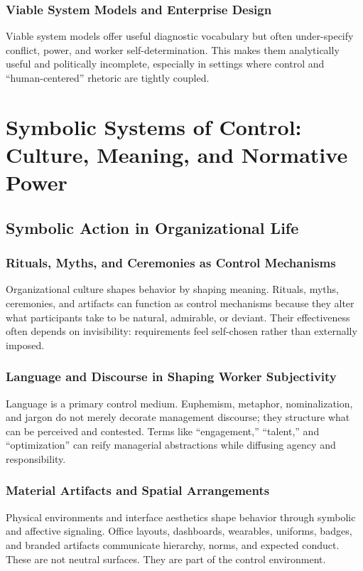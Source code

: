 \documentclass[11pt, a4paper]{article}
\begin{document}
\subsubsection{Viable System Models and Enterprise Design}
Viable system models offer useful diagnostic vocabulary but often under-specify conflict, power, and worker self-determination. This makes them analytically useful and politically incomplete, especially in settings where control and ``human-centered'' rhetoric are tightly coupled.

\section{Symbolic Systems of Control: Culture, Meaning, and Normative Power}

\subsection{Symbolic Action in Organizational Life}

\subsubsection{Rituals, Myths, and Ceremonies as Control Mechanisms}
Organizational culture shapes behavior by shaping meaning. Rituals, myths, ceremonies, and artifacts can function as control mechanisms because they alter what participants take to be natural, admirable, or deviant. Their effectiveness often depends on invisibility: requirements feel self-chosen rather than externally imposed.

\subsubsection{Language and Discourse in Shaping Worker Subjectivity}
Language is a primary control medium. Euphemism, metaphor, nominalization, and jargon do not merely decorate management discourse; they structure what can be perceived and contested. Terms like ``engagement,'' ``talent,'' and ``optimization'' can reify managerial abstractions while diffusing agency and responsibility.

\subsubsection{Material Artifacts and Spatial Arrangements}
Physical environments and interface aesthetics shape behavior through symbolic and affective signaling. Office layouts, dashboards, wearables, uniforms, badges, and branded artifacts communicate hierarchy, norms, and expected conduct. These are not neutral surfaces. They are part of the control environment.
\end{document}
